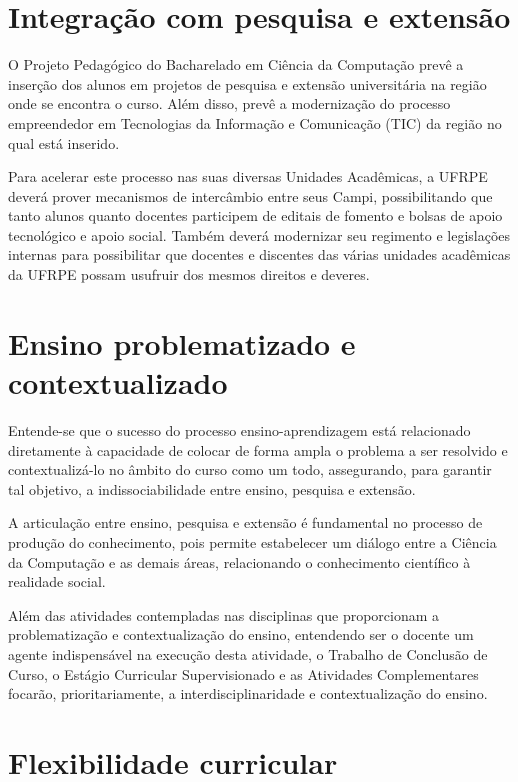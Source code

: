 \documentclass[
	12pt,				%
	openright,			%
  oneside,     %
	a4paper,			%
	english,			%
	french,				%
	spanish,			%
	brazil				%
	]{abntex2}
\begin{document}
\section{Integração com pesquisa e extensão}

O Projeto Pedagógico do Bacharelado em  Ciência da Computação prevê a inserção
dos alunos em projetos de pesquisa e extensão  universitária na região onde se
encontra o curso. Além disso, prevê a modernização  do processo empreendedor em
Tecnologias da Informação e Comunicação (TIC) da  região no qual está inserido.

Para acelerar este processo nas suas diversas Unidades  Acadêmicas, a UFRPE
deverá prover mecanismos de intercâmbio entre seus Campi, possibilitando que
tanto alunos quanto docentes participem de editais de  fomento e bolsas de apoio
tecnológico e apoio social. Também deverá modernizar  seu regimento e
legislações internas para possibilitar que docentes e  discentes das várias
unidades acadêmicas da UFRPE possam usufruir dos mesmos direitos e deveres.

\section{Ensino problematizado e contextualizado}

Entende-se que o sucesso do processo ensino-aprendizagem está
relacionado diretamente à capacidade de colocar de forma ampla o problema a ser
resolvido e contextualizá-lo no âmbito do curso como um todo, assegurando, para
garantir tal objetivo, a indissociabilidade entre ensino, pesquisa e extensão. 

A articulação entre ensino, pesquisa e extensão é fundamental no processo de
produção do conhecimento, pois permite estabelecer um diálogo entre a Ciência da
Computação e as demais áreas, relacionando o conhecimento científico à realidade
social. 

Além das atividades contempladas nas disciplinas que proporcionam a
problematização e contextualização do ensino, entendendo ser o docente um agente
indispensável na execução desta atividade, o Trabalho de Conclusão de Curso, o
Estágio Curricular Supervisionado e as Atividades Complementares focarão,
prioritariamente, a interdisciplinaridade e contextualização do ensino. 

\section{Flexibilidade curricular}
\end{document}
